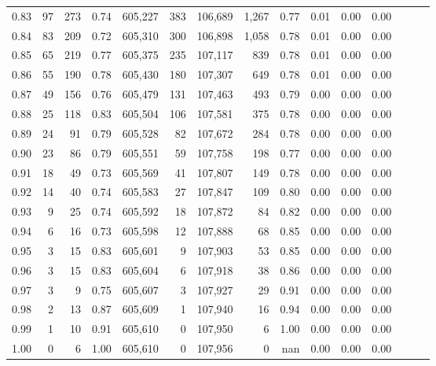 \begin{tabular}{rrrrrrrrrrrrrrr}
0.83 &      97 &    273 &  0.74 &  605,227 &      383 &  106,689 &    1,267 &  0.77 &  0.01 &  0.00 &      0.00 \\
0.84 &      83 &    209 &  0.72 &  605,310 &      300 &  106,898 &    1,058 &  0.78 &  0.01 &  0.00 &      0.00 \\
0.85 &      65 &    219 &  0.77 &  605,375 &      235 &  107,117 &      839 &  0.78 &  0.01 &  0.00 &      0.00 \\
0.86 &      55 &    190 &  0.78 &  605,430 &      180 &  107,307 &      649 &  0.78 &  0.01 &  0.00 &      0.00 \\
0.87 &      49 &    156 &  0.76 &  605,479 &      131 &  107,463 &      493 &  0.79 &  0.00 &  0.00 &      0.00 \\
0.88 &      25 &    118 &  0.83 &  605,504 &      106 &  107,581 &      375 &  0.78 &  0.00 &  0.00 &      0.00 \\
0.89 &      24 &     91 &  0.79 &  605,528 &       82 &  107,672 &      284 &  0.78 &  0.00 &  0.00 &      0.00 \\
0.90 &      23 &     86 &  0.79 &  605,551 &       59 &  107,758 &      198 &  0.77 &  0.00 &  0.00 &      0.00 \\
0.91 &      18 &     49 &  0.73 &  605,569 &       41 &  107,807 &      149 &  0.78 &  0.00 &  0.00 &      0.00 \\
0.92 &      14 &     40 &  0.74 &  605,583 &       27 &  107,847 &      109 &  0.80 &  0.00 &  0.00 &      0.00 \\
0.93 &       9 &     25 &  0.74 &  605,592 &       18 &  107,872 &       84 &  0.82 &  0.00 &  0.00 &      0.00 \\
0.94 &       6 &     16 &  0.73 &  605,598 &       12 &  107,888 &       68 &  0.85 &  0.00 &  0.00 &      0.00 \\
0.95 &       3 &     15 &  0.83 &  605,601 &        9 &  107,903 &       53 &  0.85 &  0.00 &  0.00 &      0.00 \\
0.96 &       3 &     15 &  0.83 &  605,604 &        6 &  107,918 &       38 &  0.86 &  0.00 &  0.00 &      0.00 \\
0.97 &       3 &      9 &  0.75 &  605,607 &        3 &  107,927 &       29 &  0.91 &  0.00 &  0.00 &      0.00 \\
0.98 &       2 &     13 &  0.87 &  605,609 &        1 &  107,940 &       16 &  0.94 &  0.00 &  0.00 &      0.00 \\
0.99 &       1 &     10 &  0.91 &  605,610 &        0 &  107,950 &        6 &  1.00 &  0.00 &  0.00 &      0.00 \\
1.00 &       0 &      6 &  1.00 &  605,610 &        0 &  107,956 &        0 &   nan &  0.00 &  0.00 &      0.00 \\
\bottomrule
\end{tabular}

